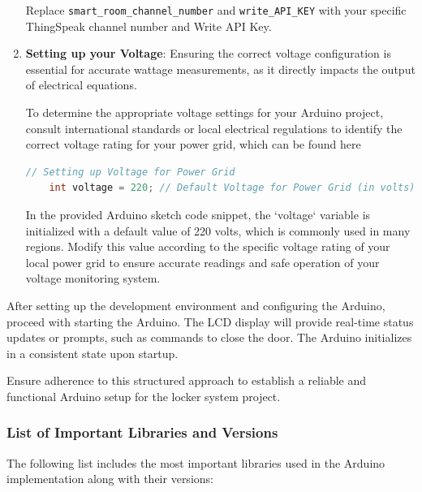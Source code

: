 \begin{enumerate}
    Replace \texttt{smart\_room\_channel\_number} and \texttt{write\_API\_KEY} with your specific ThingSpeak channel number and Write API Key.

    \item \textbf{Setting up your Voltage}:
    Ensuring the correct voltage configuration is essential for accurate wattage measurements, as it directly impacts the output of electrical equations.

    To determine the appropriate voltage settings for your 
    Arduino project, consult international 
    standards or local electrical regulations 
    to identify the correct voltage rating for 
    your power grid, which can be found here \cite{rei-world-electricity-guide}

    \begin{lstlisting}[language=C++, caption={Setting Voltage in Arduino Sketch}]
    // Setting up Voltage for Power Grid
    int voltage = 220; // Default Voltage for Power Grid (in volts)
    \end{lstlisting}

    In the provided Arduino sketch code snippet, the `voltage` variable is initialized with a default value of 220 volts, which is commonly used in many regions. Modify this value according to the specific voltage rating of your local power grid to ensure accurate readings and safe operation of your voltage monitoring system.

\end{enumerate}

After setting up the development environment and configuring the Arduino,
proceed with starting the Arduino.
The LCD display will provide real-time status updates or prompts,
such as commands to close the door. 
The Arduino initializes in a consistent state upon startup.

Ensure adherence to this structured approach to establish a reliable 
and functional Arduino setup for the locker system project.

\subsubsection{List of Important Libraries and Versions}\label{sec:ArduinoLibaries}

The following list includes the most important libraries used in the Arduino implementation along with their versions:

